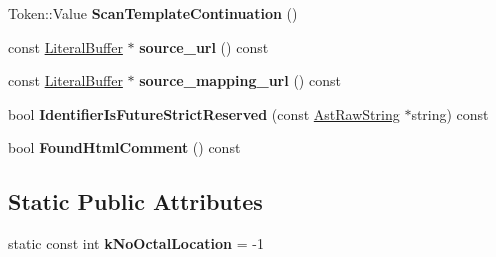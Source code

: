 \begin{DoxyCompactItemize}
\item 
Token\+::\+Value {\bfseries Scan\+Template\+Continuation} ()\hypertarget{classv8_1_1internal_1_1_scanner_a55e23955e70102d7623126d6c7dbb555}{}\label{classv8_1_1internal_1_1_scanner_a55e23955e70102d7623126d6c7dbb555}

\item 
const \hyperlink{classv8_1_1internal_1_1_literal_buffer}{Literal\+Buffer} $\ast$ {\bfseries source\+\_\+url} () const \hypertarget{classv8_1_1internal_1_1_scanner_a1f31d1068b5fa28a82d2a91e76ac1617}{}\label{classv8_1_1internal_1_1_scanner_a1f31d1068b5fa28a82d2a91e76ac1617}

\item 
const \hyperlink{classv8_1_1internal_1_1_literal_buffer}{Literal\+Buffer} $\ast$ {\bfseries source\+\_\+mapping\+\_\+url} () const \hypertarget{classv8_1_1internal_1_1_scanner_a9df4bed4be1a8cfe7bac47d3a1059925}{}\label{classv8_1_1internal_1_1_scanner_a9df4bed4be1a8cfe7bac47d3a1059925}

\item 
bool {\bfseries Identifier\+Is\+Future\+Strict\+Reserved} (const \hyperlink{classv8_1_1internal_1_1_ast_raw_string}{Ast\+Raw\+String} $\ast$string) const \hypertarget{classv8_1_1internal_1_1_scanner_a48a4737599b149a311ac343391271cd4}{}\label{classv8_1_1internal_1_1_scanner_a48a4737599b149a311ac343391271cd4}

\item 
bool {\bfseries Found\+Html\+Comment} () const \hypertarget{classv8_1_1internal_1_1_scanner_a3fe2c1875dd1f8aa1f6e7d8f7e0b8ac0}{}\label{classv8_1_1internal_1_1_scanner_a3fe2c1875dd1f8aa1f6e7d8f7e0b8ac0}

\end{DoxyCompactItemize}
\subsection*{Static Public Attributes}
\begin{DoxyCompactItemize}
\item 
static const int {\bfseries k\+No\+Octal\+Location} = -\/1\hypertarget{classv8_1_1internal_1_1_scanner_a3ee71c47804e353b42e2c114ee1471ed}{}\label{classv8_1_1internal_1_1_scanner_a3ee71c47804e353b42e2c114ee1471ed}

\end{DoxyCompactItemize}
